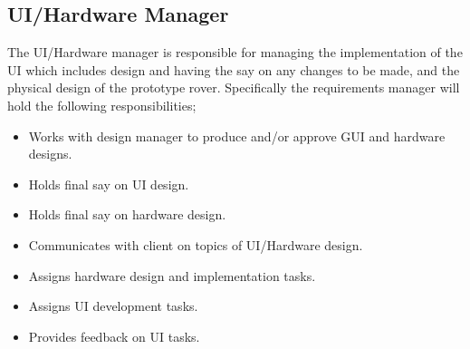 \documentclass{article}
\begin{document}
\begin{adjustwidth}{0em}{0pt}
\subsection{UI/Hardware Manager}
\begin{adjustwidth}{1em}{0pt}
The UI/Hardware manager is responsible for managing the implementation of the UI which includes design and having the say on any changes to be made, and the physical design of the prototype rover. Specifically the requirements manager will hold the following responsibilities;
\begin{itemize}
\item Works with design manager to produce and/or approve GUI and hardware designs.
\item Holds final say on UI design.
\item Holds final say on hardware design.
\item Communicates with client on topics of UI/Hardware design.
\item Assigns hardware design and implementation tasks.
\item Assigns UI development tasks. 
\item Provides feedback on UI tasks.
\end{itemize} 
\end{adjustwidth}


\end{adjustwidth}
\end{document}
